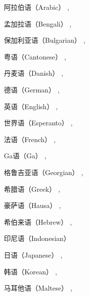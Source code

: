 \begin{itemize}
%
\item 阿拉伯语（Arabic） \citep*{HBZ2010a-u,Hahn2011a-u,MIRA2012a-u,BH2014a-u,LBL2015a-u,AHMW2015a-u},
\item 孟加拉语（Bengali） \citep*{Paul2004a-u,IHR2012a-u},
\item 保加利亚语（Bulgarian） \citep*{SOSK2004a-u,Osenova2010a-u,Osenova2010b-u,Osenova2011a-u},
\item 粤语（Cantonese） \citep*{FSB2015a-u},
\item 丹麦语（Danish） \citep{Oersnes95a,Oersnes2009a,NP2004a,MuellerPredication,MOe2011a,MuellerCopula,MOeDanish},
\item 德语（German）
\citep{%
Kiss91a,%
Netter93a-u,Netter96a,%
Meurers94,%
HMRSW97a-ed,Kordoni99a-ed-not-crossreferenced,Tseng2000a-ed,%
GK94-u,%
Keller95,%
Babel,Mueller99a,%
MK2000a,Crysmann2003b,Crysmann2005a-u,Crysmann2005c,%
MuellerLehrbuch1,%
KP2007a,KP2008a-u,Kaufmann2009a-u,Fokkens2011a}, 
\item 英语（English） \citep*{CF2000a-u,FCS2000a,Flickinger2000a,Dahlloef2002a-u,Dahlloef2003a-u,dKM2003b,MdKM2003a,DKMM2004a-u}, 
\item 世界语（Esperanto） \citep{Li96a-u},
\item 法语（French） \citep*{Tseng2003b-u},
\item Ga语（Ga） \citep*{KDHB2007a,Hellan2007a-u},
\item 格鲁吉亚语（Georgian） \citep{Abzianidze2011a-u},
\item 希腊语（Greek） \citep{KN2005a-u},
{\sloppy
\item 豪萨语（Hausa） \citep{Crysmann2005b-u,Crysmann2009a-u,Crysmann2011a-u,Crysmann2012a-u,Crysmann2016a},
\item 希伯来语（Hebrew） \citep*{MelnikHandWritten,HMW2013a-u,AHMW2015a-u}, 
\item 印尼语（Indonesian） \citep*{MBS2015a-u}
\item 日语（Japanese） \citep{Siegel2000a,SB2002a,BS2005a,SBB2016a}, 
}
\item 韩语（Korean） \citep*{KY2003a-u,KY2004a-u,KY2006a,KY2009a-u,KSY2007a-u,SKBY2010a-u,KYSB2011a-u},
\item 马耳他语（Maltese） \citep{MuellerMalteseSketch},

\end{itemize}
